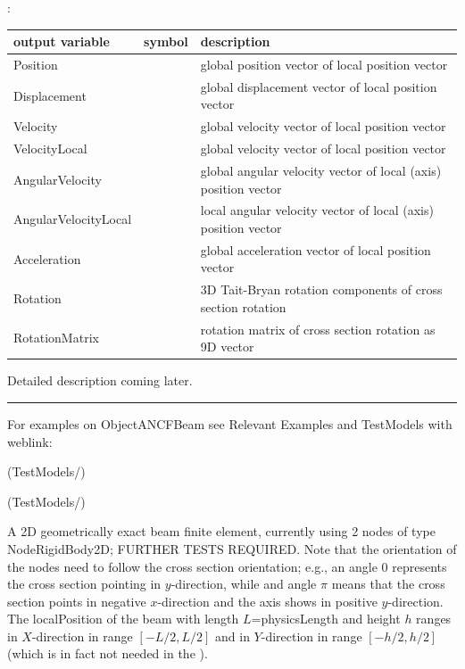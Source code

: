:
\begin{center}
\footnotesize
\begin{longtable}{| p{5cm} | p{5cm} | p{6cm} |} 
\hline
\bf output variable & \bf symbol & \bf description \\ \hline
Position &  & global position vector of local position vector\\ \hline
Displacement &  & global displacement vector of local position vector\\ \hline
Velocity &  & global velocity vector of local position vector\\ \hline
VelocityLocal &  & global velocity vector of local position vector\\ \hline
AngularVelocity &  & global angular velocity vector of local (axis) position vector\\ \hline
AngularVelocityLocal &  & local angular velocity vector of local (axis) position vector\\ \hline
Acceleration &  & global acceleration vector of local position vector\\ \hline
Rotation &  & 3D Tait-Bryan rotation components of cross section rotation\\ \hline
RotationMatrix &  & rotation matrix of cross section rotation as 9D vector\\ \hline
\end{longtable}
\end{center}
 \noindent
    Detailed description coming later.
\vspace{6pt}\par\noindent\rule{\textwidth}{0.4pt}
%
\noindent For examples on ObjectANCFBeam see Relevant Examples and TestModels with weblink:
\bi
\item {} (TestModels/)
\item {} (TestModels/)

\ei

%
\newpage


\label{sec:item:ObjectBeamGeometricallyExact2D}
A 2D geometrically exact beam finite element, currently using 2 nodes of type NodeRigidBody2D; FURTHER TESTS REQUIRED. Note that the orientation of the nodes need to follow the cross section orientation; e.g., an angle 0 represents the cross section pointing in $y$-direction, while and angle $\pi$ means that the cross section points in negative $x$-direction and the axis shows in positive $y$-direction. The localPosition of the beam with length $L$=physicsLength and height $h$ ranges in $X$-direction in range $[-L/2, L/2]$ and in $Y$-direction in range $[-h/2,h/2]$ (which is in fact not needed in the ).
\vspace{12pt}\\


